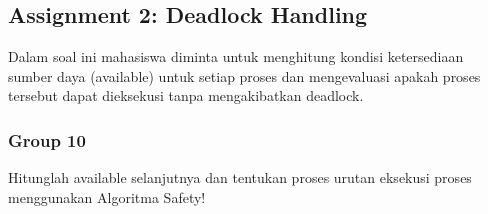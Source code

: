 \documentclass[12pt]{article}
\begin{document}
\subsection{Assignment 2: Deadlock Handling}
Dalam soal ini mahasiswa diminta untuk menghitung kondisi ketersediaan sumber daya (available) untuk setiap proses dan mengevaluasi apakah proses tersebut dapat dieksekusi tanpa mengakibatkan deadlock.
\subsubsection{Group 10}
Hitunglah available selanjutnya dan tentukan proses urutan eksekusi proses menggunakan Algoritma Safety!

\begin{table}[H]
    \centering %
    \caption{Tabel Algoritma Safety} %
    \label{tab:your_label1} %
\end{table}
\end{document}
